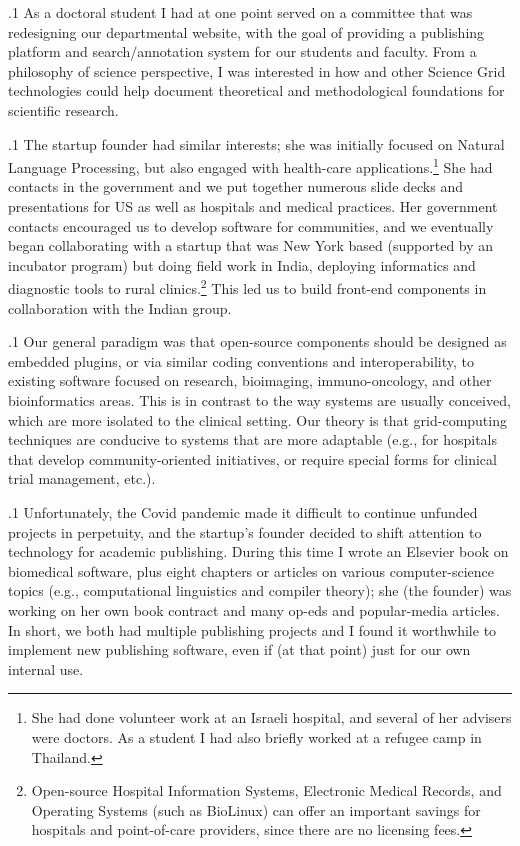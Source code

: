 \documentclass[11pt, twoside]{article}
\begin{document}
{\p.1{%
As a doctoral student I had at one point served on a committee that
was redesigning our departmental website, with the goal of
providing a publishing platform and search/annotation system for our students and faculty. From
a philosophy of science perspective, I was interested in
how  and other Science Grid
technologies could help document theoretical and methodological
foundations for scientific research.
}%

\p.1{%
The startup founder
had similar interests; she was initially focused on
Natural Language Processing, but also engaged with health-care
applications.\footnote{She had done volunteer work at an Israeli
hospital, and several of her advisers were doctors.
As a student I
had also briefly worked at a refugee camp in Thailand.}
She had contacts in the government and we put together
numerous slide decks and presentations for US 
as well as hospitals and medical practices. Her government
contacts encouraged us to develop software for
 communities, and we eventually began
collaborating with a startup that was New York based (supported by
an  incubator program) but doing field work in India, deploying
informatics and diagnostic tools to rural clinics.\footnote{Open-source
Hospital Information Systems, Electronic
Medical Records, and Operating Systems (such as
BioLinux) can offer an important savings for hospitals
and point-of-care providers, since there are no
licensing fees.}  This led us to build front-end components
in collaboration with the Indian group.
}%

\p.1{%
Our general
paradigm was that open-source  components should be
designed as embedded plugins, or via similar coding
conventions and interoperability, to existing
software focused on research, bioimaging, immuno-oncology,
and other bioinformatics areas. This is in contrast to
the way  systems are usually conceived, which are more
isolated to the clinical setting. Our theory is that grid-computing
techniques are conducive to  systems that are more adaptable
(e.g., for hospitals that develop community-oriented initiatives,
or require special forms for clinical trial management, etc.).
}%

\p.1{%
Unfortunately, the Covid pandemic made it difficult to continue unfunded
projects in perpetuity, and the startup's founder decided to
shift attention to technology for academic publishing. During this
time I wrote an Elsevier book on biomedical software, plus eight
chapters or articles on various computer-science topics
(e.g., computational linguistics and compiler theory); she
(the founder) was working on her own book contract and many op-eds
and popular-media articles. In short, we both had multiple publishing
projects and I found it worthwhile to implement new publishing software,
even if (at that point) just for our own internal use.
}%

}
\end{document}
